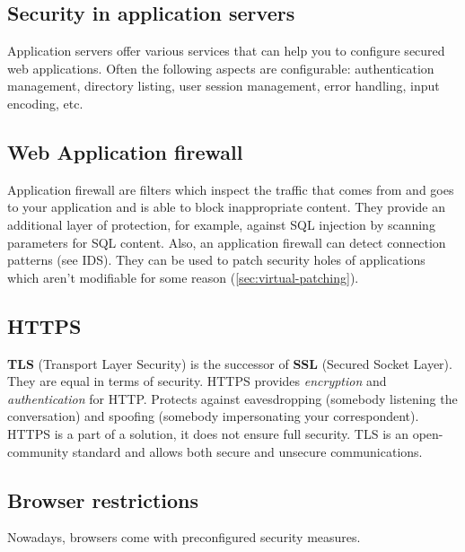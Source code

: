 \subsection{Security in application servers}

Application servers offer various services that can help you to configure
secured web applications.
Often the following aspects are configurable: authentication management,
directory listing, user session management, error handling, input encoding,
etc.

\subsection{Web Application firewall}

Application firewall are filters which inspect the traffic that comes
from and goes to your application and is able to block inappropriate
content.
They provide an additional layer of protection, for example, against
SQL injection by scanning parameters for SQL content.
Also, an application firewall can detect connection patterns (see IDS).
They can be used to patch security holes of applications which aren't
modifiable for some reason (\autoref{sec:virtual-patching}).

\subsection{HTTPS}

\textbf{TLS} (Transport Layer Security) is the successor of \textbf{SSL}
(Secured Socket Layer).
They are equal in terms of security.
HTTPS provides \emph{encryption} and \emph{authentication} for HTTP.
\newline Protects against eavesdropping (somebody listening the
conversation) and spoofing (somebody impersonating your correspondent).
HTTPS is a part of a solution, it does not ensure full security.
TLS is an open-community standard and allows both secure and unsecure
communications.

\subsection{Browser restrictions}

Nowadays, browsers come with preconfigured security measures.

